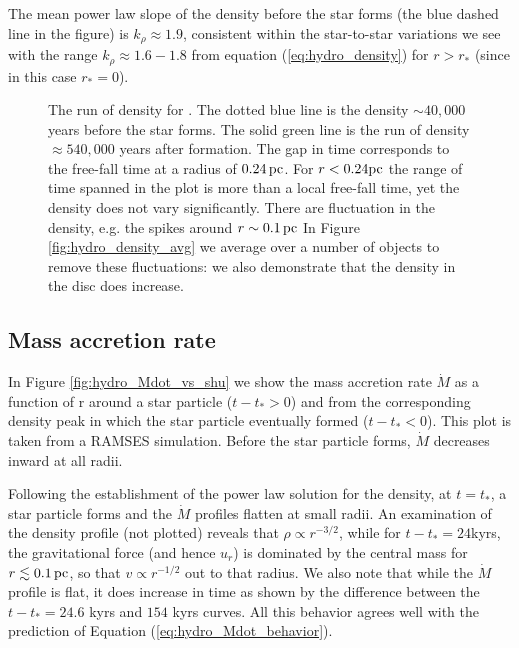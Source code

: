 \documentclass[../dissertation.tex]{subfiles}
\begin{document}
The mean power law slope of the density before the star forms (the blue dashed line in the figure) is $k_\rho \approx 1.9$, consistent within the star-to-star variations we see  with the range $k_\rho \approx 1.6 - 1.8$ from equation (\ref{eq:hydro_density}) for $r>r_*$ (since in this case $r_*=0$).

%
\begin{figure}[htb] %
\caption[Hydro Run of Density]{\label{fig:hydro_quad2_run_of_density_double}The run of density for \partA. The dotted blue line is the 
density $\sim 40,000$ years before the star forms.
The solid green line is the run of density $\approx 540,000$ years after formation. 
The gap in time corresponds to the free-fall time at a radius of $0.24\,\rm pc$.
For $r < 0.24 {\rm pc}$ the range of time spanned in the plot is more than a local free-fall time, yet the density does not vary significantly.
There are fluctuation in the density, e.g. the spikes around $r \sim 0.1\,\rm pc$
In Figure \ref{fig:hydro_density_avg} we average over a number of objects to remove these fluctuations: we also demonstrate that the density in the disc does increase.}

\end{figure}
%
\subsection{Mass accretion rate}\label{sec:hydro_Mass_accretion}

In Figure \ref{fig:hydro_Mdot_vs_shu} we show the mass accretion rate $\dot{M}$ as a function of r around a star particle ($t-t_* > 0$) and from the corresponding density peak in which the star particle eventually formed ($t-t_*<0$). This plot is taken from a RAMSES simulation. Before the star particle forms, $\dot{M}$ decreases inward at all radii. 

Following the establishment of the power law solution for the density, at $t=t_*$, a star particle forms and the $\dot{M}$ profiles flatten at small radii. An examination of the density profile (not plotted) reveals that $\rho\propto r^{-3/2}$, while for $t-t_*=24$kyrs, the gravitational force (and hence $u_r$) is dominated by the central mass for $r\lesssim0.1\,\rm pc$, so that $v\propto r^{-1/2}$ out to that radius. We also note that while the $\dot{M}$ profile is flat, it does increase in time as shown by the difference between the $t-t_* = 24.6$ kyrs and $154$ kyrs curves. All this behavior agrees well with the prediction of Equation (\ref{eq:hydro_Mdot_behavior}).
\end{document}
